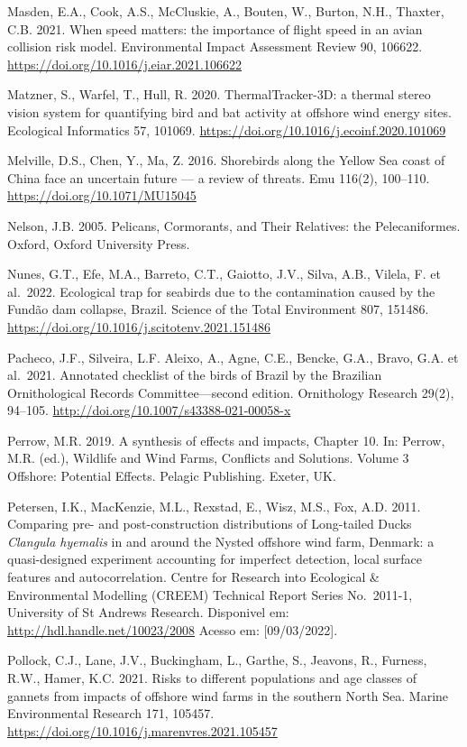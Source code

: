 \documentclass[
  oneside]{scrbook}
\begin{document}
Masden, E.A., Cook, A.S., McCluskie, A., Bouten, W., Burton, N.H., Thaxter, C.B. 2021. When speed matters: the importance of flight speed in an avian collision risk model. Environmental Impact Assessment Review 90, 106622. \url{https://doi.org/10.1016/j.eiar.2021.106622}

Matzner, S., Warfel, T., Hull, R. 2020. ThermalTracker-3D: a thermal stereo vision system for quantifying bird and bat activity at offshore wind energy sites. Ecological Informatics 57, 101069. \url{https://doi.org/10.1016/j.ecoinf.2020.101069}

Melville, D.S., Chen, Y., Ma, Z. 2016. Shorebirds along the Yellow Sea coast of China face an uncertain future --- a review of threats. Emu 116(2), 100--110. \url{https://doi.org/10.1071/MU15045}

Nelson, J.B. 2005. Pelicans, Cormorants, and Their Relatives: the Pelecaniformes. Oxford, Oxford University Press.

Nunes, G.T., Efe, M.A., Barreto, C.T., Gaiotto, J.V., Silva, A.B., Vilela, F. et al.~2022. Ecological trap for seabirds due to the contamination caused by the Fundão dam collapse, Brazil. Science of the Total Environment 807, 151486. \url{https://doi.org/10.1016/j.scitotenv.2021.151486}

Pacheco, J.F., Silveira, L.F. Aleixo, A., Agne, C.E., Bencke, G.A., Bravo, G.A. et al.~2021. Annotated checklist of the birds of Brazil by the Brazilian Ornithological Records Committee---second edition. Ornithology Research 29(2), 94--105. \url{http://doi.org/10.1007/s43388-021-00058-x}

Perrow, M.R. 2019. A synthesis of effects and impacts, Chapter 10. In: Perrow, M.R. (ed.), Wildlife and Wind Farms, Conflicts and Solutions. Volume 3 Offshore: Potential Effects. Pelagic Publishing. Exeter, UK.

Petersen, I.K., MacKenzie, M.L., Rexstad, E., Wisz, M.S., Fox, A.D. 2011. Comparing pre- and post-construction distributions of Long-tailed Ducks \emph{Clangula hyemalis} in and around the Nysted offshore wind farm, Denmark: a quasi-designed experiment accounting for imperfect detection, local surface features and autocorrelation. Centre for Research into Ecological \& Environmental Modelling (CREEM) Technical Report Series No.~2011-1, University of St Andrews Research. Disponivel em: \url{http://hdl.handle.net/10023/2008} Acesso em: {[}09/03/2022{]}.

Pollock, C.J., Lane, J.V., Buckingham, L., Garthe, S., Jeavons, R., Furness, R.W., Hamer, K.C. 2021. Risks to different populations and age classes of gannets from impacts of offshore wind farms in the southern North Sea. Marine Environmental Research 171, 105457. \url{https://doi.org/10.1016/j.marenvres.2021.105457}
\end{document}
